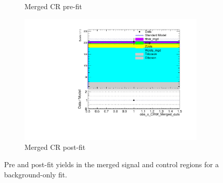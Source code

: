 \begin{figure}[h]
\begin{subfigure}{0.49\textwidth}
     \caption{Merged CR \wjets pre-fit}
     \end{subfigure}
     \begin{subfigure}{0.49\textwidth}
     \includegraphics[width = 0.98\textwidth]{Figures/5/bkg_only/CRW_Merged_cuts_afterFit.pdf}
     \caption{Merged CR \wjets post-fit}
     \end{subfigure}

     \caption{Pre and post-fit yields in the merged signal and control regions for a background-only fit.}
     \label{fig:bkg_only_mgd}
  \end{figure}

